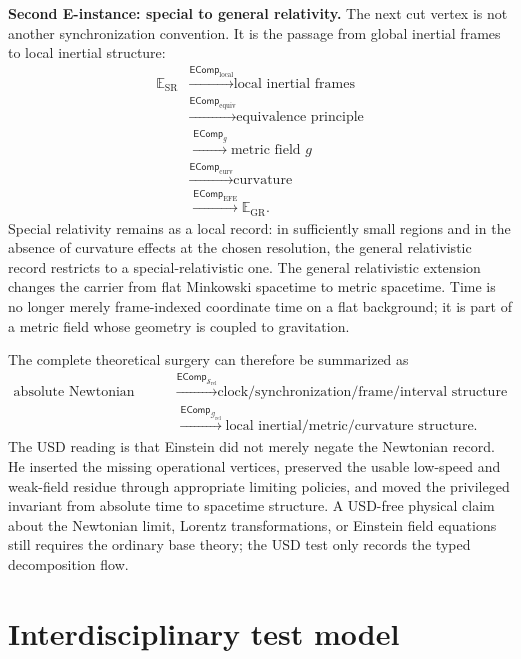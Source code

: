 \documentclass[11pt]{article}
\newcommand{\EComp}{\mathsf{EComp}}
\theoremstyle{definition}
\theoremstyle{plain}
\begin{document}
\textbf{Second E-instance: special to general relativity.}  The next cut
vertex is not another synchronization convention.  It is the passage from
global inertial frames to local inertial structure:
\[
\begin{aligned}
  \mathbb E_{\mathrm{SR}}
  &\xrightarrow{\EComp_{\mathrm{local}}}
  \text{local inertial frames}\\
  &\xrightarrow{\EComp_{\mathrm{equiv}}}
  \text{equivalence principle}\\
  &\xrightarrow{\EComp_{g}}
  \text{metric field }g\\
  &\xrightarrow{\EComp_{\mathrm{curv}}}
  \text{curvature}\\
  &\xrightarrow{\EComp_{\mathrm{EFE}}}
  \mathbb E_{\mathrm{GR}}.
\end{aligned}
\]
Special relativity remains as a local record: in sufficiently small
regions and in the absence of curvature effects at the chosen resolution,
the general relativistic record restricts to a special-relativistic one.
The general relativistic extension changes the carrier from flat
Minkowski spacetime to metric spacetime.  Time is no longer merely
frame-indexed coordinate time on a flat background; it is part of a
metric field whose geometry is coupled to gravitation.

The complete theoretical surgery can therefore be summarized as
\[
\begin{aligned}
  \text{absolute Newtonian time}
  &\xrightarrow{\EComp_{\mathcal S_{\mathrm{rel}}}}
  \text{clock/synchronization/frame/interval structure}\\
  &\xrightarrow{\EComp_{\mathcal G_{\mathrm{rel}}}}
  \text{local inertial/metric/curvature structure}.
\end{aligned}
\]
The USD reading is that Einstein did not merely negate the Newtonian
record.  He inserted the missing operational vertices, preserved the
usable low-speed and weak-field residue through appropriate limiting
policies, and moved the privileged invariant from absolute time to
spacetime structure.  A USD-free physical claim about the Newtonian limit,
Lorentz transformations, or Einstein field equations still requires the
ordinary base theory; the USD test only records the typed decomposition
flow.

\section{Interdisciplinary test model}
\end{document}
